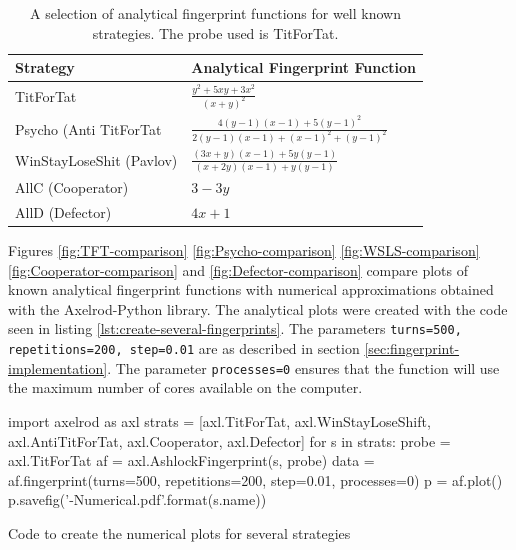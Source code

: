 \begin{table}[htbp!]
\centering
\renewcommand{\arraystretch}{2}
\setlength{\tabcolsep}{12pt}
\begin{tabular}{l l}
\toprule
Strategy                 & Analytical Fingerprint Function\\
\midrule
TitForTat                & $\displaystyle \frac{y^2 + 5xy + 3x^2}{(x + y)^2} $\\
Psycho (Anti TitForTat   & $\displaystyle \frac{4(y-1)(x-1) + 5(y-1)^2}{2(y-1)(x-1) + (x-1)^2 + (y-1)^2} $ \\
WinStayLoseShit (Pavlov) & $\displaystyle \frac{(3x+y)(x-1) + 5y(y-1)}{(x+2y)(x-1) + y(y-1)} $\\
AllC (Cooperator)        & $\displaystyle 3 - 3y $ \\
AllD (Defector)          & $\displaystyle 4x + 1 $\\
\bottomrule
\end{tabular}
\caption{A selection of analytical fingerprint functions for well known strategies. The probe used is TitForTat.}
\label{tab:fingerprint-functions}
\end{table}

Figures \ref{fig:TFT-comparison} \ref{fig:Psycho-comparison}
\ref{fig:WSLS-comparison} \ref{fig:Cooperator-comparison} and \ref{fig:Defector-comparison} compare plots of known analytical fingerprint functions with numerical approximations obtained with the Axelrod-Python library.
The analytical plots were created with the code seen in listing \ref{lst:create-several-fingerprints}.
The parameters \texttt{turns=500, repetitions=200, step=0.01} are as described in section \ref{sec:fingerprint-implementation}.
The parameter \texttt{processes=0} ensures that the function will use the maximum number of cores available on the computer.

\begin{listing}[hbtp!]
\begin{ExampleCode}
import axelrod as axl
strats = [axl.TitForTat, axl.WinStayLoseShift, axl.AntiTitForTat,
          axl.Cooperator, axl.Defector]
for s in strats:
    probe = axl.TitForTat
    af = axl.AshlockFingerprint(s, probe)
    data = af.fingerprint(turns=500, repetitions=200, step=0.01, processes=0)
    p = af.plot()
    p.savefig('{}-Numerical.pdf'.format(s.name))
\end{ExampleCode}
\caption{Code to create the numerical plots for several strategies}
\label{lst:create-several-fingerprints}
\end{listing}

